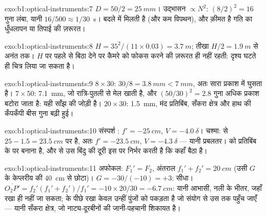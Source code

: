 \begin{solution}{exo:b1:optical-instruments:7}
$D = 50/2 = \qty{25}{mm}$। उद्भासन $\propto N^2$: $(8/2)^2 = 16$ गुना
लंबा, यानी $16/500 \approx 1/30$~\unit{s}। बदले में मिलती है 
(और कम विपथन), और क़ीमत है गति का धुँधलापन या तिपाई की ज़रूरत।
\end{solution}

\begin{solution}{exo:b1:optical-instruments:8}
$H = 35^2/(11 \times 0.03) = \qty{3.7}{m}$; तीखा $H/2 =
\qty{1.9}{m}$ से अनंत तक। $H$ पर पहले से बिठा देने पर कैमरे को फोकस करने की
ज़रूरत ही नहीं रहती: दृश्य घटते ही चित्र लिया जा सकता है।
\end{solution}

\begin{solution}{exo:b1:optical-instruments:9}
$8\times30$:  $30/8 = \qty{3.8}{mm} < \qty{7}{mm}$, अतः सारा
प्रकाश  में घुसता है। $7\times50$: \qty{7.1}{mm}, जो रात्रि-पुतली से मेल
खाती है, और $(50/30)^2 = 2.8$ गुना अधिक प्रकाश बटोरा जाता है: यही साँझ की जोड़ी
है। $20\times30$:  \qty{1.5}{mm}, मंद प्रतिबिंब, सँकरा क्षेत्र और
हाथ की कँपकँपी बीस गुना बढ़ी हुई।
\end{solution}

\begin{solution}{exo:b1:optical-instruments:10}
संस्पर्श : $f' = \qty{-25}{cm}$, $V = \qty{-4.0}{\delta}$। चश्मा:
  से $25 - 1.5 = \qty{23.5}{cm}$ पर है, अतः $f' =
\qty{-23.5}{cm}$, $V = \qty{-4.3}{\delta}$ --- यानी प्रबलतर।  को
प्रतिबिंब  के  पर बनाना है, और  से उस बिंदु की दूरी इस पर
निर्भर करती है कि  कहाँ बैठा है।
\end{solution}

\begin{solution}{exo:b1:optical-instruments:11}
अफोकल: $F_1' = F_2$, अंतराल $f_1' + f_2' = \qty{20}{cm}$ (उसी $G$ के
केप्लरीय की \qty{40}{cm} से छोटा)। $G = -30/(-10) =
+3$: सीधा।  $\overline{O_2P'} = f_2'(f_1' + f_2')/f_1' =
-10 \times 20/30 = \qty{-6.7}{cm}$: यानी आभासी, नली के भीतर, जहाँ  रखा
ही नहीं जा सकता;  के पीछे रखा  केवल उन्हीं पुंजों को पकड़ता है जो
संयोग से उस तक पहुँच जाएँ --- यानी सँकरा क्षेत्र, जो नाट्य-दूरबीनों की जानी-पहचानी
शिकायत है।
\end{solution}

